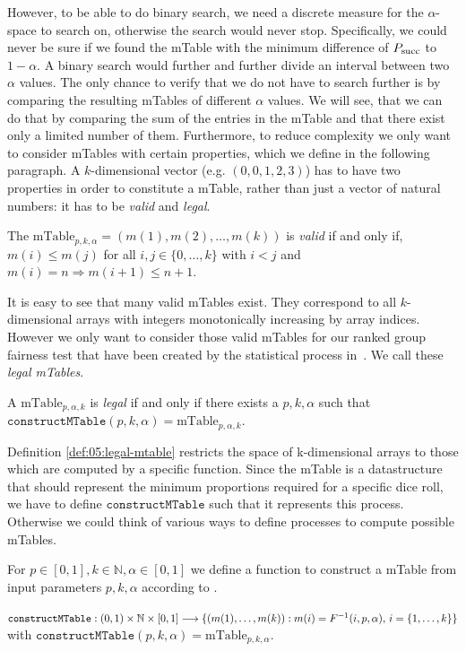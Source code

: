 However, to be able to do binary search, we need a discrete measure for the $\alpha$-space to search on, otherwise the search would never stop. Specifically, we could never be sure if we found the mTable with the minimum difference of $P_{\operatorname{succ}}$ to $1-\alpha$. A binary search would further and further divide an interval between two $\alpha$ values. The only chance to verify that we do not have to search further is by comparing the resulting mTables of different $\alpha$ values. We will see, that we can do that by comparing the sum of the entries in the mTable and that there exist only a limited number of them.
%
Furthermore, to reduce complexity we only want to consider mTables with certain properties, which we define in the following paragraph.
%
A $k$-dimensional vector (e.g. $(0,0,1,2,3)$) has to have two properties in order to constitute a mTable, rather than just a vector of natural numbers: it has to be \emph{valid} and \emph{legal}.
%
\begin{definition}
	\label{def:05:valid-mtable}
	The $\text{mTable}_{p,k,\alpha}=(m(1) , m(2) , \ldots , m(k))$ is \emph{valid} if and only if, $m(i) \leq m(j)$ for all $i,j \in \lbrace 0, \ldots, k \rbrace$ with $i < j$ and $m(i)=n \Rightarrow m(i+1) \leq n+1$.
\end{definition}
\noindent It is easy to see that many valid mTables exist.
%
They correspond to all $k$-dimensional arrays with integers monotonically increasing by array indices.
%
However we only want to consider those valid mTables for our ranked group fairness test that have been created by the statistical process in~\citet{yang2016measuring}.
%
We call these \textit{legal mTables}.
%
\begin{definition}
	\label{def:05:legal-mtable}
	A $\text{mTable}_{p,\alpha,k}$ is \textit{legal} if and only if there exists a $p,k,\alpha$ such that
	$\texttt{constructMTable}(p,k,\alpha)=\text{mTable}_{p,\alpha,k}$.
\end{definition}
%
Definition \ref{def:05:legal-mtable} restricts the space of k-dimensional arrays to those which are computed by a specific function. Since the mTable is a datastructure that should represent the minimum proportions required for a specific dice roll, we have to define $\texttt{constructMTable}$ such that it represents this process. Otherwise we could think of various ways to define processes to compute possible mTables.
\begin{definition}[constructMTable]
	\label{def:05:construct-mtable-single-test}
	For $p\in [0,1], k \in \mathbb{N}, \alpha \in [0,1]$ we define a function to construct a mTable from input parameters $p, k, \alpha$ according to \cite{yang2016measuring}.

	\noindent$\texttt{constructMTable} : \\ (0,1) \times \mathbb{N} \times [0,1] \longrightarrow \lbrace (m(1) ,\ldots, m(k)): m(i) = F^{-1}(i,p,\alpha), \, i = \{1,\ldots,k\}\rbrace$ \\
	with $\texttt{constructMTable}(p,k,\alpha)=\text{mTable}_{p,k,\alpha}$.
\end{definition}
